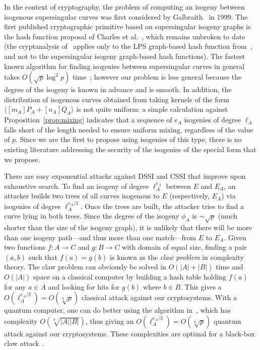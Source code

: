 \documentclass[jmc]{degruyter-journal-a}
\theoremstyle{definition}
\newcommand{\cyc}[1]{{\langle #1 \rangle}}
\begin{document}
In the context of cryptography, the problem of computing an isogeny
between isogenous supersingular curves was first considered by
Galbraith~\cite{Gal} in 1999. The first published cryptographic
primitive based on supersingular isogeny graphs is the hash function
proposal of Charles et al.~\cite{CGL}, which remains unbroken to date
(the cryptanalysis of~\cite{quis} applies only to the LPS graph-based
hash function from~\cite{CGL}, and not to the supersingular isogeny
graph-based hash functions). The fastest known algorithm for finding
isogenies between supersingular curves in general takes $O(\sqrt{p}
\log^2 p)$ time~\cite[\S 5.3.1]{CGL}; however our problem is less
general because the degree of the isogeny is known in advance and is
smooth. In addition, the distribution of isogenous
  curves obtained
from taking kernels of the form $\cyc{[m_A]P_A+[n_A]Q_A}$ is not quite
uniform: a simple calculation against Proposition~\ref{prop:mixing}
indicates that a sequence of $e_A$ isogenies of degree $\ell_A$ falls
short of the length needed to ensure uniform mixing, regardless of the
value of $p$. Since we are the first to propose using isogenies of
this type, there is no existing literature addressing the security
of the isogenies of the special form that we propose.

There are easy exponential attacks against DSSI and CSSI that improve
upon exhaustive search. To find an isogeny of degree $\ell_A^{e_A}$
between $E$ and $E_A$, an attacker builds two trees of all curves
isogenous to $E$ (respectively, $E_A$) via isogenies of degree
$\ell_A^{e_A/2}$. Once the trees are built, the attacker tries to find
a curve lying in both trees. Since the degree of the isogeny $\phi_A$
is $\sim\sqrt{p}$ (much shorter than the size of the isogeny graph),
it is unlikely that there will be more than one isogeny path---and
thus more than one match---from $E$ to $E_A$. Given two functions
$f:A\to C$ and $g:B\to C$ with domain of equal size, finding a pair
$(a,b)$ such that $f(a)=g(b)$ is known as the \emph{claw problem} in
complexity theory. The claw problem can obviously be solved in $O(|A|
+ |B|)$ time and $O(|A|)$ space on a classical computer by building a
hash table holding $f(a)$ for any $a\in A$ and looking for hits for
$g(b)$ where $b\in B$. This gives a $O(\ell_A^{e_A/2})=O(\sqrt[4]{p})$
classical attack against our cryptosystems. With a quantum computer,
one can do better using the algorithm in~\cite{tani}, which has
complexity $O(\sqrt[3]{|A||B|})$, thus giving an
$O(\ell_A^{e_A/3})=O(\sqrt[6]{p})$ quantum attack against our
cryptosystems. These complexities are optimal for a black-box claw
attack~\cite{zhang}.
\end{document}
